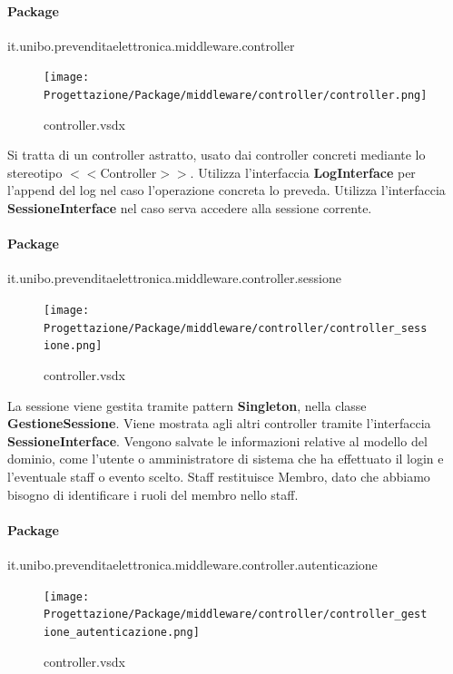 \documentclass[a4paper]{article}
\begin{document}
\newpage

\paragraph{Package} it.unibo.prevenditaelettronica.middleware.controller

\begin{figure}[H]
    \texttt{[image: Progettazione/Package/middleware/controller/controller.png]}
    \centering
    \caption{controller.vsdx}
\end{figure}

Si tratta di un controller astratto, usato dai controller concreti mediante lo stereotipo $<<$Controller$>>$. Utilizza l'interfaccia \textbf{LogInterface} per l'append del log nel caso l'operazione concreta lo preveda. Utilizza l'interfaccia \textbf{SessioneInterface} nel caso serva accedere alla sessione corrente.

\newpage

\paragraph{Package} it.unibo.prevenditaelettronica.middleware.controller.sessione

\begin{figure}[H]
    \texttt{[image: Progettazione/Package/middleware/controller/controller\_sessione.png]}
    \centering
    \caption{controller.vsdx}
\end{figure}

La sessione viene gestita tramite pattern \textbf{Singleton}, nella classe \textbf{GestioneSessione}. Viene mostrata agli altri controller tramite l'interfaccia \textbf{SessioneInterface}. Vengono salvate le informazioni relative al modello del dominio, come l'utente o amministratore di sistema che ha effettuato il login e l'eventuale staff o evento scelto. Staff restituisce Membro, dato che abbiamo bisogno di identificare i ruoli del membro nello staff.

\newpage

\paragraph{Package} it.unibo.prevenditaelettronica.middleware.controller.autenticazione



\begin{figure}[H]
    \texttt{[image: Progettazione/Package/middleware/controller/controller\_gestione\_autenticazione.png]}
    \centering
    \caption{controller.vsdx}
\end{figure}
\end{document}

